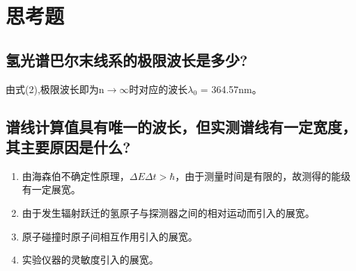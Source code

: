 \documentclass[a4paper]{article}
\begin{document}
\section{思考题}
\subsection{氢光谱巴尔末线系的极限波长是多少?}
由式(2),极限波长即为n$\to\infty$时对应的波长$\lambda_0$ = 364.57nm。

\subsection{谱线计算值具有唯一的波长，但实测谱线有一定宽度，其主要原因是什么? }
\begin{enumerate}
    \item 由海森伯不确定性原理，$\Delta E\Delta t > \hbar$，由于测量时间是有限的，故测得的能级有一定展宽。
    \item 由于发生辐射跃迁的氢原子与探测器之间的相对运动而引入的展宽。
    \item 原子碰撞时原子间相互作用引入的展宽。
    \item 实验仪器的灵敏度引入的展宽。
\end{enumerate}
\nocite{jiaocai}

\end{document}
